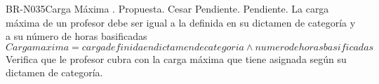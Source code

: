 \begin{BusinessRule}{BR-N035}{Carga Máxima}
	{\bcCondition}    %
	{\btEnabler}     %
	{\blControlling}    %
	.
	\BRItem[Estado] Propuesta.
	 Cesar
	 Pendiente.
	 Pendiente.
	\BRItem[Descripción] La carga máxima de un profesor debe ser igual a la definida en su dictamen de categoría y a su número de horas basificadas
		\BRItem[Sentencia]  $Carga maxima = carga definida en dictamen de categoria \wedge numero de horas basificadas$
		\BRItem[Motivación] Verifica que le profesor cubra con la carga máxima que tiene asignada según su dictamen de categoría.
\end{BusinessRule}

